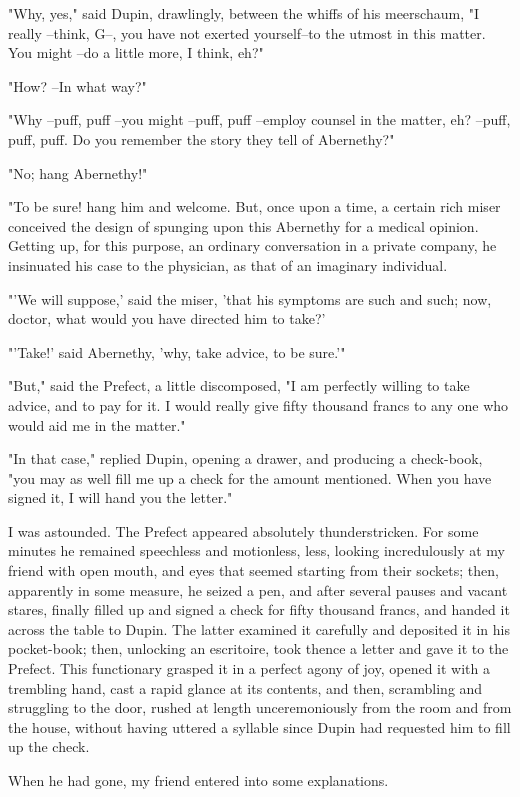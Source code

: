 \documentclass{article}
\begin{document}
"Why, yes," said Dupin, drawlingly, between the whiffs of his meerschaum, "I really --think, G--, you have not exerted yourself--to the utmost in this matter. You might --do a little more, I think, eh?"

"How? --In what way?"

"Why --puff, puff --you might --puff, puff --employ counsel in the matter, eh? --puff, puff, puff. Do you remember the story they tell of Abernethy?"

"No; hang Abernethy!"

"To be sure! hang him and welcome. But, once upon a time, a certain rich miser conceived the design of spunging upon this Abernethy for a medical opinion. Getting up, for this purpose, an ordinary conversation in a private company, he insinuated his case to the physician, as that of an imaginary individual.

"'We will suppose,' said the miser, 'that his symptoms are such and such; now, doctor, what would you have directed him to take?'

"'Take!' said Abernethy, 'why, take advice, to be sure.'"

"But," said the Prefect, a little discomposed, "I am perfectly willing to take advice, and to pay for it. I would really give fifty thousand francs to any one who would aid me in the matter."

"In that case," replied Dupin, opening a drawer, and producing a check-book, "you may as well fill me up a check for the amount mentioned. When you have signed it, I will hand you the letter."

I was astounded. The Prefect appeared absolutely thunderstricken. For some minutes he remained speechless and motionless, less, looking incredulously at my friend with open mouth, and eyes that seemed starting from their sockets; then, apparently in some measure, he seized a pen, and after several pauses and vacant stares, finally filled up and signed a check for fifty thousand francs, and handed it across the table to Dupin. The latter examined it carefully and deposited it in his pocket-book; then, unlocking an escritoire, took thence a letter and gave it to the Prefect. This functionary grasped it in a perfect agony of joy, opened it with a trembling hand, cast a rapid glance at its contents, and then, scrambling and struggling to the door, rushed at length unceremoniously from the room and from the house, without having uttered a syllable since Dupin had requested him to fill up the check.

When he had gone, my friend entered into some explanations.
\end{document}
